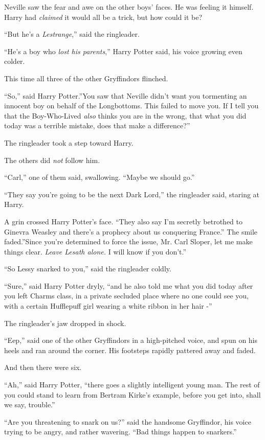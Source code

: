 Neville saw the fear and awe on the other boys' faces. He was feeling it
himself. Harry had \emph{claimed} it would all be a trick, but how could
it be?

``But he's a \emph{Lestrange},'' said the ringleader.

``He's a boy who \emph{lost his parents},'' Harry Potter said, his voice
growing even colder.

This time all three of the other Gryffindors flinched.

``So,'' said Harry Potter.''You saw that Neville didn't want you
tormenting an innocent boy on behalf of the Longbottoms. This failed to
move you. If I tell you that the Boy-Who-Lived \emph{also} thinks you
are in the wrong, that what you did today was a terrible mistake, does
that make a difference?''

The ringleader took a step toward Harry.

The others did \emph{not} follow him.

``Carl,'' one of them said, swallowing. ``Maybe we should go.''

``They say you're going to be the next Dark Lord,'' the ringleader said,
staring at Harry.

A grin crossed Harry Potter's face. ``They also say I'm secretly
betrothed to Ginevra Weasley and there's a prophecy about us conquering
France.'' The smile faded.''Since you're determined to force the issue,
Mr. Carl Sloper, let me make things clear. \emph{Leave Lesath alone.} I
will know if you don't.''

``So Lessy snarked to you,'' said the ringleader coldly.

``Sure,'' said Harry Potter dryly, ``and he also told me what you did
today after you left Charms class, in a private secluded place where no
one could see you, with a certain Hufflepuff girl wearing a white ribbon
in her hair -''

The ringleader's jaw dropped in shock.

``Eep,'' said one of the other Gryffindors in a high-pitched voice, and
spun on his heels and ran around the corner. His footsteps rapidly
pattered away and faded.

And then there were six.

``Ah,'' said Harry Potter, ``there goes a slightly intelligent young
man. The rest of you could stand to learn from Bertram Kirke's example,
before you get into, shall we say, trouble.''

``Are you threatening to snark on us?'' said the handsome Gryffindor,
his voice trying to be angry, and rather wavering. ``Bad things happen
to snarkers.''

